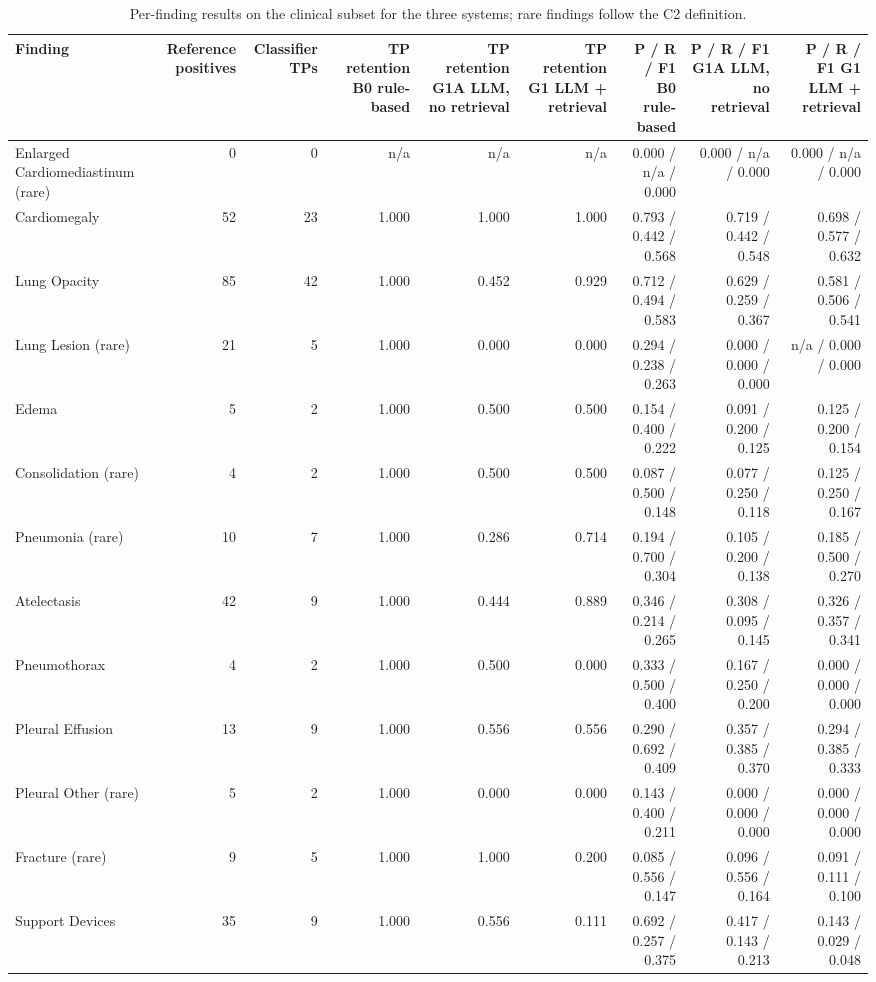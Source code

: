 \begin{table}[t]
\centering
\scriptsize
\begin{tabular}{lrrrrrrrr}
\hline
Finding & Reference positives & Classifier TPs & TP retention B0 rule-based & TP retention G1A LLM, no retrieval & TP retention G1 LLM + retrieval & P / R / F1 B0 rule-based & P / R / F1 G1A LLM, no retrieval & P / R / F1 G1 LLM + retrieval \\
\hline
Enlarged Cardiomediastinum (rare) & 0 & 0 & n/a & n/a & n/a & 0.000 / n/a / 0.000 & 0.000 / n/a / 0.000 & 0.000 / n/a / 0.000 \\
Cardiomegaly & 52 & 23 & 1.000 & 1.000 & 1.000 & 0.793 / 0.442 / 0.568 & 0.719 / 0.442 / 0.548 & 0.698 / 0.577 / 0.632 \\
Lung Opacity & 85 & 42 & 1.000 & 0.452 & 0.929 & 0.712 / 0.494 / 0.583 & 0.629 / 0.259 / 0.367 & 0.581 / 0.506 / 0.541 \\
Lung Lesion (rare) & 21 & 5 & 1.000 & 0.000 & 0.000 & 0.294 / 0.238 / 0.263 & 0.000 / 0.000 / 0.000 & n/a / 0.000 / 0.000 \\
Edema & 5 & 2 & 1.000 & 0.500 & 0.500 & 0.154 / 0.400 / 0.222 & 0.091 / 0.200 / 0.125 & 0.125 / 0.200 / 0.154 \\
Consolidation (rare) & 4 & 2 & 1.000 & 0.500 & 0.500 & 0.087 / 0.500 / 0.148 & 0.077 / 0.250 / 0.118 & 0.125 / 0.250 / 0.167 \\
Pneumonia (rare) & 10 & 7 & 1.000 & 0.286 & 0.714 & 0.194 / 0.700 / 0.304 & 0.105 / 0.200 / 0.138 & 0.185 / 0.500 / 0.270 \\
Atelectasis & 42 & 9 & 1.000 & 0.444 & 0.889 & 0.346 / 0.214 / 0.265 & 0.308 / 0.095 / 0.145 & 0.326 / 0.357 / 0.341 \\
Pneumothorax & 4 & 2 & 1.000 & 0.500 & 0.000 & 0.333 / 0.500 / 0.400 & 0.167 / 0.250 / 0.200 & 0.000 / 0.000 / 0.000 \\
Pleural Effusion & 13 & 9 & 1.000 & 0.556 & 0.556 & 0.290 / 0.692 / 0.409 & 0.357 / 0.385 / 0.370 & 0.294 / 0.385 / 0.333 \\
Pleural Other (rare) & 5 & 2 & 1.000 & 0.000 & 0.000 & 0.143 / 0.400 / 0.211 & 0.000 / 0.000 / 0.000 & 0.000 / 0.000 / 0.000 \\
Fracture (rare) & 9 & 5 & 1.000 & 1.000 & 0.200 & 0.085 / 0.556 / 0.147 & 0.096 / 0.556 / 0.164 & 0.091 / 0.111 / 0.100 \\
Support Devices & 35 & 9 & 1.000 & 0.556 & 0.111 & 0.692 / 0.257 / 0.375 & 0.417 / 0.143 / 0.213 & 0.143 / 0.029 / 0.048 \\
\hline
\end{tabular}
\caption{Per-finding results on the clinical subset for the three systems; rare findings follow the C2 definition.}
\label{tab:table3_per_finding_results}
\end{table}
